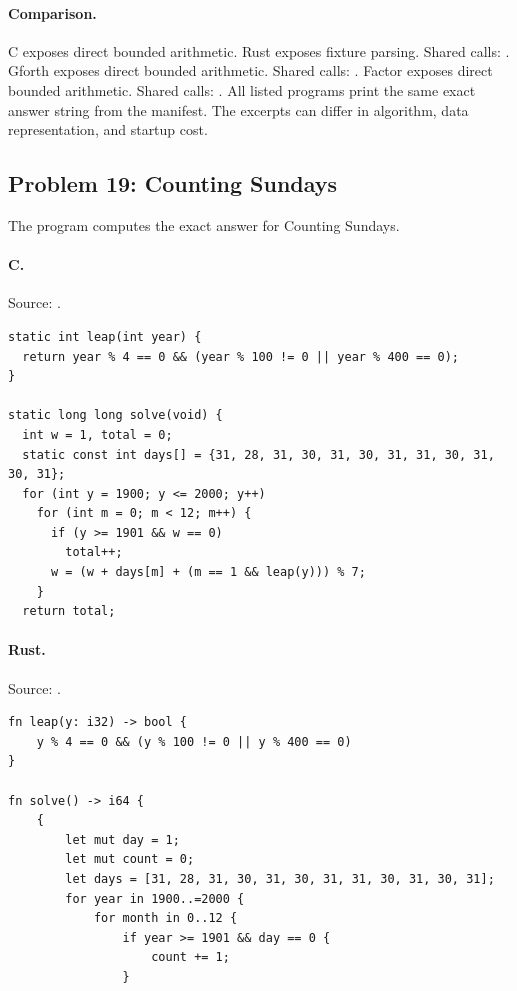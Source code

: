 \paragraph{Comparison.}
C exposes direct bounded arithmetic. Rust exposes fixture parsing. Shared calls: \texttt{}. Gforth exposes direct bounded arithmetic. Shared calls: \texttt{}. Factor exposes direct bounded arithmetic. Shared calls: \texttt{}.
All listed programs print the same exact answer string from the manifest. The excerpts can differ in algorithm, data representation, and startup cost.

\subsection{Problem 19: Counting Sundays}
\label{walkthrough:p19}
The program computes the exact answer for Counting Sundays.

\paragraph{C.} Source: .
\begin{lstlisting}
static int leap(int year) {
  return year % 4 == 0 && (year % 100 != 0 || year % 400 == 0);
}

static long long solve(void) {
  int w = 1, total = 0;
  static const int days[] = {31, 28, 31, 30, 31, 30, 31, 31, 30, 31, 30, 31};
  for (int y = 1900; y <= 2000; y++)
    for (int m = 0; m < 12; m++) {
      if (y >= 1901 && w == 0)
        total++;
      w = (w + days[m] + (m == 1 && leap(y))) % 7;
    }
  return total;
\end{lstlisting}

\paragraph{Rust.} Source: .
\begin{lstlisting}
fn leap(y: i32) -> bool {
    y % 4 == 0 && (y % 100 != 0 || y % 400 == 0)
}

fn solve() -> i64 {
    {
        let mut day = 1;
        let mut count = 0;
        let days = [31, 28, 31, 30, 31, 30, 31, 31, 30, 31, 30, 31];
        for year in 1900..=2000 {
            for month in 0..12 {
                if year >= 1901 && day == 0 {
                    count += 1;
                }
\end{lstlisting}

